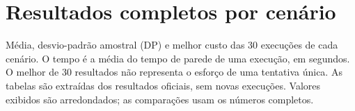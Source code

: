 








\section{Resultados completos por cenário}\label{ap:resultados}

Média, desvio-padrão amostral (DP) e melhor custo das 30 execuções de cada cenário. O tempo é a média do tempo de parede de uma execução, em segundos. O melhor de 30 resultados não representa o esforço de uma tentativa única. As tabelas são extraídas dos resultados oficiais, sem novas execuções. Valores exibidos são arredondados; as comparações usam os números completos.

